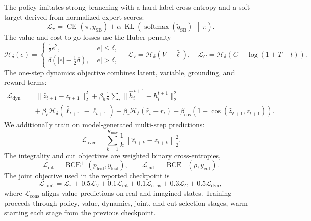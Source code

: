 \documentclass[11pt,a4paper]{article}
\newcommand{\softmax}{\operatorname{softmax}}
\begin{document}
The policy imitates strong branching with a hard-label cross-entropy and a soft target derived from normalized expert scores:
\begin{equation}
  \mathcal{L}_{\pi}
  =
  \operatorname{CE}(\pi,y_{\mathrm{SB}})
  +\alpha\,
    \operatorname{KL}\!\left(
      \softmax(\widetilde q_{\mathrm{SB}})
      \,\middle\|\,\pi
    \right).
  \label{eq:policy-loss}
\end{equation}
The value and cost-to-go losses use the Huber penalty
\begin{equation}
  \mathcal{H}_\delta(e)=
  \begin{cases}
    \frac12 e^2,& |e|\le\delta,\\
    \delta\left(|e|-\frac12\delta\right),& |e|>\delta,
  \end{cases}
  \quad
  \mathcal{L}_V=\mathcal{H}_\delta(V-\bar\ell),
  \quad
  \mathcal{L}_C=\mathcal{H}_\delta(C-\log(1+T-t)).
  \label{eq:huber}
\end{equation}
The one-step dynamics objective combines latent, variable, grounding, and reward terms:
\begin{align}
  \mathcal{L}_{\mathrm{dyn}}
  &=
  \|\widehat z_{t+1}-z_{t+1}\|_2^2
  +\beta_h\frac1n\sum_i
    \|\widehat h_i^{\,t+1}-h_i^{t+1}\|_2^2 \nonumber\\
  &\quad
  +\beta_\ell\mathcal{H}_\delta(\widehat\ell_{t+1}-\ell_{t+1})
  +\beta_r\mathcal{H}_\delta(\widehat r_t-r_t)
  +\beta_{\cos}
    \left(1-\cos(\widehat z_{t+1},z_{t+1})\right).
  \label{eq:dynamics-loss}
\end{align}
We additionally train on model-generated multi-step predictions:
\begin{equation}
  \mathcal{L}_{\mathrm{over}}=
  \sum_{k=1}^{K_{\max}}\frac1k
  \left\|\widehat z_{t+k}-z_{t+k}\right\|_2^2 .
  \label{eq:overshoot}
\end{equation}
The integrality and cut objectives are weighted binary cross-entropies,
\begin{equation}
  \mathcal{L}_{\mathrm{int}}=\operatorname{BCE}^{+}(p_{\mathrm{leaf}},y_{\mathrm{leaf}}),
  \qquad
  \mathcal{L}_{\mathrm{cut}}=\operatorname{BCE}^{+}(\rho,y_{\mathrm{cut}}).
  \label{eq:bce}
\end{equation}
The joint objective used in the reported checkpoint is
\begin{equation}
  \mathcal{L}_{\mathrm{joint}}
  =
  \mathcal{L}_{\pi}
  +0.5\mathcal{L}_{V}
  +0.1\mathcal{L}_{\mathrm{int}}
  +0.1\mathcal{L}_{\mathrm{cons}}
  +0.3\mathcal{L}_{C}
  +0.5\mathcal{L}_{\mathrm{dyn}},
  \label{eq:joint-loss}
\end{equation}
where $\mathcal{L}_{\mathrm{cons}}$ aligns value predictions on real and imagined states. Training proceeds through policy, value, dynamics, joint, and cut-selection stages, warm-starting each stage from the previous checkpoint.
\end{document}
